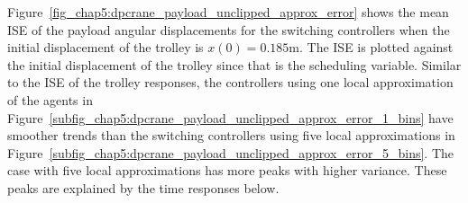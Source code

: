 Figure~\ref{fig_chap5:dpcrane_payload_unclipped_approx_error} shows the mean ISE of the payload angular displacements for the switching controllers when the initial displacement of the trolley is $x(0)=0.185\si{\meter}$.
%
The ISE is plotted against the initial displacement of the trolley since that is the scheduling variable. Similar to the ISE of the trolley responses, the controllers using one local approximation of the agents in Figure~\ref{subfig_chap5:dpcrane_payload_unclipped_approx_error_1_bins} have smoother trends than the switching controllers using five local approximations in Figure~\ref{subfig_chap5:dpcrane_payload_unclipped_approx_error_5_bins}. The case with five local approximations has more peaks with higher variance. These peaks are explained by the time responses below.
%
